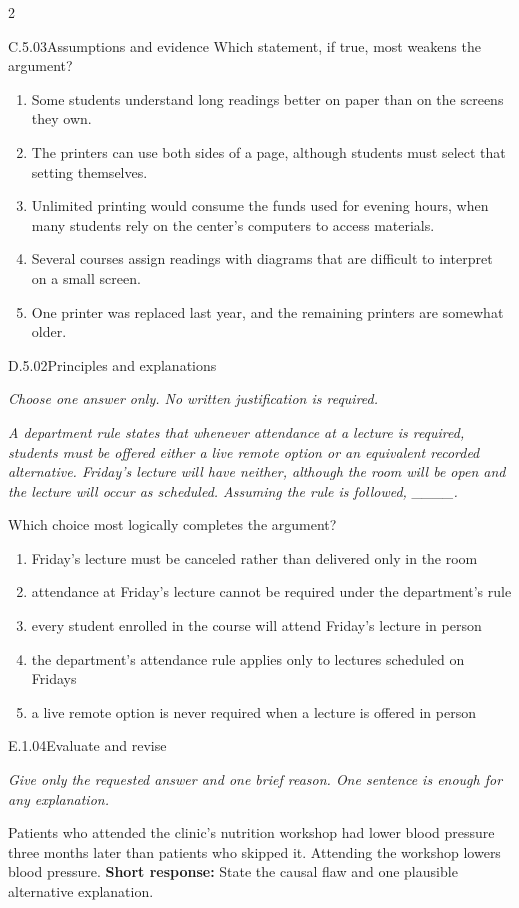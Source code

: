 \documentclass[9pt]{extarticle}
\newcommand{\choice}[1]{\item #1}
\begin{document}
\begin{multicols}{2}
\begin{DenseCoreProblem}{C.5.03}{Assumptions and evidence}
Which statement, if true, most weakens the argument?
\begin{enumerate}[label=(\alph*)]
  \choice{Some students understand long readings better on paper than on the screens they own.}
  \choice{The printers can use both sides of a page, although students must select that setting themselves.}
  \choice{Unlimited printing would consume the funds used for evening hours, when many students rely on the center's computers to access materials.}
  \choice{Several courses assign readings with diagrams that are difficult to interpret on a small screen.}
  \choice{One printer was replaced last year, and the remaining printers are somewhat older.}
\end{enumerate}
\end{DenseCoreProblem}
\begin{DenseCoreProblem}{D.5.02}{Principles and explanations}
{\scriptsize\textit{Choose one answer only. No written justification is required.}\par}
\emph{A department rule states that whenever attendance at a lecture is required, students must be offered either a live remote option or an equivalent recorded alternative. Friday's lecture will have neither, although the room will be open and the lecture will occur as scheduled. Assuming the rule is followed, \_\_\_\_.}

Which choice most logically completes the argument?
\begin{enumerate}[label=(\alph*)]
  \choice{Friday's lecture must be canceled rather than delivered only in the room}
  \choice{attendance at Friday's lecture cannot be required under the department's rule}
  \choice{every student enrolled in the course will attend Friday's lecture in person}
  \choice{the department's attendance rule applies only to lectures scheduled on Fridays}
  \choice{a live remote option is never required when a lecture is offered in person}
\end{enumerate}
\end{DenseCoreProblem}
\begin{DenseCoreProblem}{E.1.04}{Evaluate and revise}
{\scriptsize\textit{Give only the requested answer and one brief reason. One sentence is enough for any explanation.}\par}
Patients who attended the clinic's nutrition workshop had lower blood pressure three months later than patients who skipped it. Attending the workshop lowers blood pressure.
\textbf{Short response:} State the causal flaw and one plausible alternative explanation.
\end{DenseCoreProblem}
\end{multicols}
\end{document}
